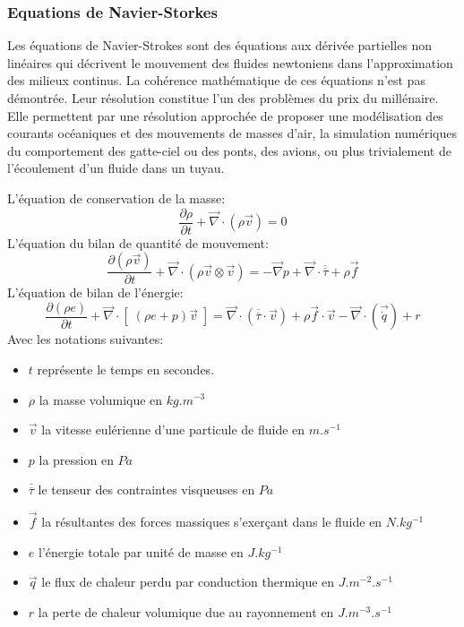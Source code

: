 \documentclass[10pt,a4paper]{article}
\begin{document}
\subsubsection{Equations de Navier-Storkes\cite{navierstrokes}}
Les équations de Navier-Strokes sont des équations aux dérivée partielles non linéaires qui décrivent le mouvement des fluides newtoniens dans l'approximation des milieux continus. La cohérence mathématique de ces équations n'est pas démontrée. Leur résolution constitue l'un des problèmes du prix du millénaire\cite{prixmillenaire}.
Elle permettent par une résolution approchée de proposer une modélisation des courants océaniques et des mouvements de masses d'air, la simulation numériques du comportement des gatte-ciel ou des ponts, des avions, ou plus trivialement de l'écoulement d'un fluide dans un tuyau.

L'équation de conservation de la masse:
\begin{equation}
\frac{\partial \rho}{\partial t} + \overrightarrow{\nabla} \cdot (\rho \vec{v}) = 0
\end{equation}
L'équation du bilan de quantité de mouvement:
\begin{equation}
\frac{\partial \left( \rho \vec{v} \right)}{\partial t} + \overrightarrow{\nabla} \cdot \left(\rho \vec{v} \otimes \vec{v} \right) = - \overrightarrow{\nabla} p + \overrightarrow{\nabla} \cdot \overline{\overline {\tau}} + \rho \vec{f}
\end{equation}
L'équation de bilan de l'énergie:
\begin{equation}
\frac{\partial \left( \rho e\right)}{\partial t} + \overrightarrow{\nabla} \cdot \left[ \; \left(\rho e + p\right) \vec{v} \; \right] = \overrightarrow{\nabla} \cdot \left( \overline{\overline {\tau}} \cdot \vec{v} \right) + \rho \vec{f} \cdot \vec{v} -\overrightarrow{\nabla} \cdot  (\vec{\dot{q}}) + r
\end{equation}
Avec les notations suivantes:
\begin{itemize}
\item $t$ représente le temps en secondes.
\item $\rho$ la masse volumique en $kg.m^{-3}$
\item $\vec{v}$ la vitesse eulérienne d'une particule de fluide en $m.s^{-1}$
\item $p$ la pression en $Pa$
\item $\overline{\overline {\tau}}$ le tenseur des contraintes visqueuses en $Pa$
\item $\vec{f}$ la résultantes des forces massiques s'exerçant dans le fluide en $N.kg^{-1}$
\item $e$ l'énergie totale par unité de masse en $J.kg^{-1}$
\item $\vec{q}$ le flux de chaleur perdu par conduction thermique en $J.m^{-2}.s^{-1}$
\item $r$ la perte de chaleur volumique due au rayonnement en $J.m^{-3}.s^{-1}$
\end{itemize}
\end{document}
